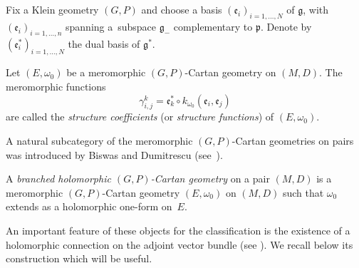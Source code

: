\documentclass[10pt,a4paper]{amsart}
\numberwithin{equation}{section}
\begin{document}
Fix a Klein geometry $(G,P)$ and choose a basis $(\mathfrak{e}_i)_{i=1,\dots,N}$ of $\mathfrak{g}$, with $(\mathfrak{e}_i)_{i=1,\dots,n}$ spanning a~subspace $\mathfrak{g}_-$ complementary to $\mathfrak{p}$. Denote by $(\mathfrak{e}_i^*)_{i=1,\dots,N}$ the dual basis of $\mathfrak{g}^*$.
\begin{Definition}\label{constantes}Let $(E,\omega_0)$ be a meromorphic $(G,P)$-Cartan geometry on $(M,D)$. The meromorphic functions
\[\gamma_{i,j}^k= \mathfrak{e}_k^* \circ k_{\omega_0}(\mathfrak{e}_i,\mathfrak{e}_j) \]
 are called the \textit{structure coefficients} (or \textit{structure functions}) of $(E,\omega_0)$. \end{Definition}

A natural subcategory of the meromorphic $(G,P)$-Cartan geometries on pairs was introduced by Biswas and Dumitrescu (see~\cite{BD}).

\begin{Definition}\label{branchedCartan} A \textit{branched holomorphic $(G,P)$-Cartan geometry} on a pair $(M,D)$ is a meromorphic $(G,P)$-Cartan geometry $(E,\omega_0)$ on $(M,D)$ such that $\omega_0$ extends as a holomorphic one-form on~$E$.
\end{Definition}

An important feature of these objects for the classification is the existence of a holomorphic connection on the adjoint vector bundle (see \cite[p.~7]{BD}). We recall below its construction which will be useful.
\end{document}
